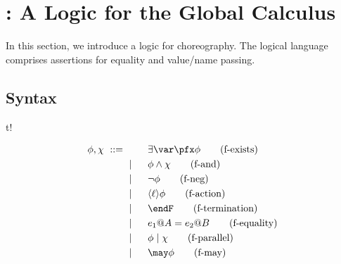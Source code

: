 \section{\texorpdfstring{\GL}{GL}: A Logic for the Global Calculus}\label{Logic4Struct:sec:globalLogic}

In this section, we introduce a logic for choreography.  The logical language comprises
assertions for equality and value/name passing.

\subsection{Syntax}
\begin{myfigure}{t!} \vspace{0.5cm}
  \begin{minipage}{.5\textwidth}
    \begin{alignat}{3}
      \phi, \chi \ ::= \ & \phantom{{} \mid {}}
      & \ & \exists \var\pfx \phi \label{Logic4Struct:eq:exists} \tag{f-exists}\\
      & \mid && \phi \land \chi \label{Logic4Struct:eq:and} \tag{f-and} \\
      & \mid && \neg \phi \label{Logic4Struct:eq:neg} \tag{f-neg} \\
      & \mid && \langle\ell\rangle \phi \label{Logic4Struct:eq:action} \tag{f-action} \\
      & \mid && \endF \label{Logic4Struct:eq:termination} \tag{f-termination} \\
      & \mid && e_1@A = e_2@B \label{Logic4Struct:eq:equality} \tag{f-equality} \\
      & \mid && \phi \mid \chi \label{Logic4Struct:eq:parallel} \tag{f-parallel} \\
      & \mid && \may \phi \label{Logic4Struct:eq:may} \tag{f-may} %

\end{alignat}
\end{minipage}
\end{myfigure}
